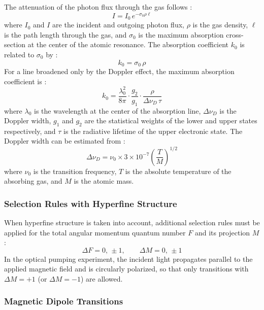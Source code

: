 The attenuation of the photon flux through the gas follows :
\begin{equation}
    I = I_0\,e^{-\sigma_0 \rho \ell}
    \label{eq:beer_lambert}
\end{equation}
where $I_0$ and $I$ are the incident and outgoing photon flux, $\rho$ is the gas density,
$\ell$ is the path length through the gas, and $\sigma_0$ is the maximum absorption
cross-section at the center of the atomic resonance. The absorption coefficient $k_0$ is
related to $\sigma_0$ by :
\begin{equation}
    k_0 = \sigma_0\,\rho
    \label{eq:abs_coeff}
\end{equation}
For a line broadened only by the Doppler effect, the maximum absorption coefficient is :
\begin{equation}
    k_0 = \frac{\lambda_0^2}{8\pi}\cdot\frac{g_2}{g_1}\cdot\frac{\rho}{\Delta\nu_D\,\tau}
    \label{eq:k0}
\end{equation}
where $\lambda_0$ is the wavelength at the center of the absorption line, $\Delta\nu_D$ is
the Doppler width, $g_1$ and $g_2$ are the statistical weights of the lower and upper
states respectively, and $\tau$ is the radiative lifetime of the upper electronic state.
The Doppler width can be estimated from :
\begin{equation}
    \Delta\nu_D = \nu_0 \times 3\times10^{-7}
                  \left(\frac{T}{M}\right)^{1/2}
    \label{eq:doppler_width}
\end{equation}
where $\nu_0$ is the transition frequency, $T$ is the absolute temperature of the absorbing
gas, and $M$ is the atomic mass.
 
\subsubsection*{Selection Rules with Hyperfine Structure}
 
When hyperfine structure is taken into account, additional selection rules must be applied
for the total angular momentum quantum number $F$ and its projection $M$:
\begin{equation}
    \Delta F = 0,\,\pm 1,
    \qquad
    \Delta M = 0,\,\pm 1
    \label{eq:hfs_selection}
\end{equation}
In the optical pumping experiment, the incident light propagates parallel to the applied
magnetic field and is circularly polarized, so that only transitions with $\Delta M = +1$
(or $\Delta M = -1$) are allowed.
 
\subsubsection*{Magnetic Dipole Transitions}
 
